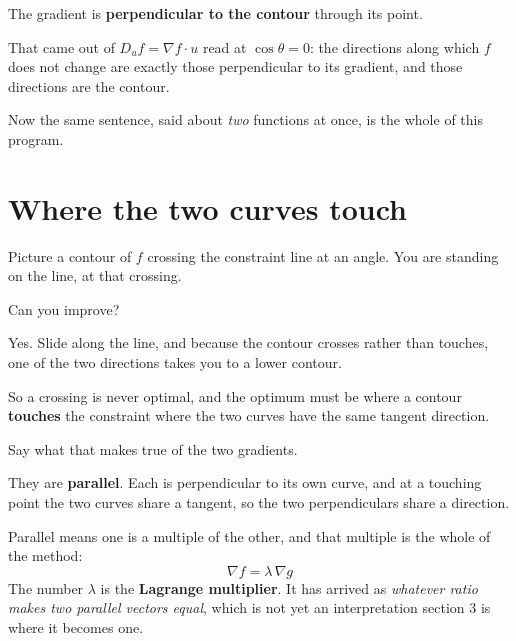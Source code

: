\begin{fr}
\begin{ansblock}
The gradient is \textbf{perpendicular to the contour} through its point.
\end{ansblock}

That came out of $D_u f = \nabla f \cdot u$ read at $\cos\theta = 0$: the
directions along which $f$ does not change are exactly those perpendicular to
its gradient, and those directions are the contour.

Now the same sentence, said about \emph{two} functions at once, is the whole
of this program.

\end{fr}

\section{Where the two curves touch}
\label{sec:P22-stationarity}

\begin{fr}
Picture a contour of $f$ crossing the constraint line at an angle. You are
standing on the line, at that crossing.

Can you improve?
\dotline
\nextframe
\end{fr}

\begin{fr}
\begin{ansblock}
Yes. Slide along the line, and because the contour crosses rather than touches,
one of the two directions takes you to a lower contour.
\end{ansblock}

So a crossing is never optimal, and the optimum must be where a contour
\textbf{touches} the constraint \dash{} where the two curves have the same
tangent direction.

Say what that makes true of the two gradients.
\nextframe
\end{fr}

\begin{fr}
\begin{ansblock}
They are \textbf{parallel}. Each is perpendicular to its own curve, and at a
touching point the two curves share a tangent, so the two perpendiculars share
a direction.
\end{ansblock}

Parallel means one is a multiple of the other, and that multiple is the whole
of the method:
\[ \nabla f = \lambda \,\nabla g \]
The number $\lambda$ is the \textbf{Lagrange multiplier}. It has arrived as
\emph{whatever ratio makes two parallel vectors equal}, which is not yet an
interpretation \dash{} section 3 is where it becomes one.
\end{fr}

